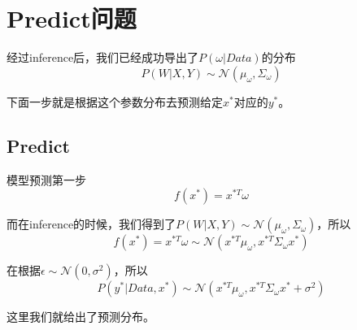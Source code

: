 \chapter{Predict问题}

经过inference后，我们已经成功导出了$P(\omega|Data)$的分布
\begin{equation}
    P(W|X,Y)\sim \mathcal{N}(\mu_\omega,\varSigma_\omega)
\end{equation}

下面一步就是根据这个参数分布去预测给定$x^*$对应的$y^*$。

\section{Predict}

模型预测第一步
\begin{equation}
    f(x^*)=x^{*T}\omega
\end{equation}

而在inference的时候，我们得到了$P(W|X,Y)\sim \mathcal{N}(\mu_\omega,\varSigma_\omega)$，所以
\begin{equation}
    f(x^*)=x^{*T}\omega\sim \mathcal{N}(x^{*T}\mu_\omega,x^{*T}\varSigma_\omega x^*)
\end{equation}

在根据$\epsilon\sim \mathcal{N}(0,\sigma^2)$，所以
\begin{equation}
    P(y^*|Data,x^*)\sim \mathcal{N}(x^{*T}\mu_\omega, x^{*T}\varSigma_{\omega}x^*+\sigma^2)
\end{equation}

这里我们就给出了预测分布。